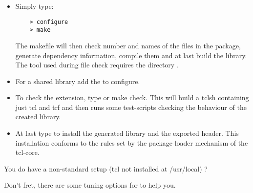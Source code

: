 \begin {itemize}
\item	Simply type:

\begin{verbatim}
	> configure
	> make
\end{verbatim}

The makefile will then check number and names of the files in the
package, generate dependency information, compile them and at last
build the library.  The tool  used during file
check requires the directory .


\item	For a shared library add the  to \cmd
	{configure}. 


\item	To check the extension, type  or \cmd
	{make check}. This will build a tclsh containing just tcl and
	trf and then runs some test-scripts checking the behaviour of
	the created library. 

\item	At last type  to install the generated
	library and the exported header. This installation conforms to
	the rules set by the package loader mechanism of the tcl-core. 
\end {itemize}

You do have a non-standard setup (tcl not installed at \file
{/usr/local}) ?

Don't fret, there are some tuning options for  to help
you. 

